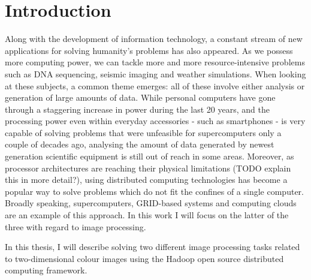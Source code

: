 \documentclass [12pt,a4paper]{report}
\begin{document}
\begin{tiitelleht}



\end{tiitelleht}


\tableofcontents

\chapter{Introduction}

Along with the development of information technology, a constant stream of new applications for solving humanity's problems has also appeared. As we possess more computing power, we can tackle more and more resource-intensive problems such as DNA sequencing, seismic imaging and weather simulations. When looking at these subjects, a common theme emerges: all of these involve either analysis or generation of large amounts of data. While personal computers have gone through a staggering increase in power during the last 20 years, and the processing power even within everyday accessories - such as smartphones - is very capable of solving problems that were unfeasible for supercomputers only a couple of decades ago, analysing the amount of data generated by newest generation scientific equipment is still out of reach in some areas. Moreover, as processor architectures are reaching their physical limitations (TODO explain this in more detail?), using distributed computing technologies has become a popular way to solve problems which do not fit the confines of a single computer. Broadly speaking, supercomputers, GRID-based systems and computing clouds are an example of this approach. In this work I will focus on the latter of the three with regard to image processing.

In this thesis, I will describe solving two different image processing tasks related to two-dimensional colour images using the Hadoop open source distributed computing framework. %
\end{document}
